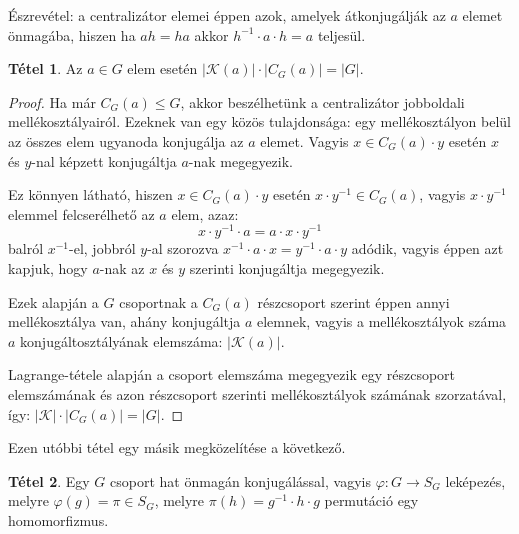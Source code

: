\documentclass[12pt]{book}
\theoremstyle{plain} %
\theoremstyle{definition} %
\newtheorem{theo/}{Tétel}[section]
\newenvironment{theo}
  {\renewcommand{\qedsymbol}{$\clubsuit$}%
   \pushQED{\qed}\begin{theo/}}
  {\popQED\end{theo/}}
\theoremstyle{remark}
\renewcommand\qedsymbol{$\blacksquare$}
\numberwithin{equation}{section}  %
\begin{document}
	Észrevétel: a centralizátor elemei éppen azok, amelyek átkonjugálják az $a$ elemet önmagába, hiszen ha $ah = ha$ akkor $h^{-1}\cdot a \cdot h = a$ teljesül.
	
	\begin{theo}\label{konjcentr}
		Az $a\in G$ elem esetén $|\mathcal{K}(a)| \cdot |C_G(a)| = |G|$.
	\end{theo}

	\begin{proof}
		Ha már $C_G(a)\leq G$, akkor beszélhetünk a centralizátor jobboldali mellékosztályairól. Ezeknek van egy közös tulajdonsága:  egy mellékosztályon belül az összes elem ugyanoda konjugálja az $a$ elemet. Vagyis $x\in C_G(a)\cdot y$ esetén $x$ és $y$-nal képzett konjugáltja $a$-nak megegyezik.
		
		Ez könnyen látható, hiszen $x\in C_G(a)\cdot y$ esetén $x\cdot y^{-1} \in C_G(a)$, vagyis $x\cdot y^{-1}$ elemmel felcserélhető az $a$ elem, azaz:
		\[ x\cdot y^{-1} \cdot a = a \cdot x \cdot y^{-1}  \]
		balról $x^{-1}$-el, jobbról $y$-al szorozva $x^{-1}\cdot a \cdot x = y^{-1} \cdot a \cdot y$ adódik, vagyis éppen azt kapjuk, hogy $a$-nak az $x$ és $y$ szerinti konjugáltja megegyezik.
		
		Ezek alapján a $G$ csoportnak a $C_G(a)$ részcsoport szerint éppen annyi mellékosztálya van, ahány konjugáltja $a$ elemnek, vagyis a mellékosztályok száma $a$ konjugáltosztályának elemszáma: $|\mathcal{K}(a)|$. 
		
		Lagrange-tétele alapján a csoport elemszáma megegyezik egy részcsoport elemszámának és azon részcsoport szerinti mellékosztályok számának szorzatával, így: $|\mathcal{K}|\cdot |C_G(a)| = |G|$.
	\end{proof}

	Ezen utóbbi tétel egy másik megközelítése a következő.
	
	\begin{theo}
		Egy $G$ csoport hat önmagán konjugálással, vagyis $\varphi\colon G\to S_G$ leképezés, melyre $\varphi(g) = \pi\in S_G$, melyre $\pi(h) = g^{-1}\cdot h \cdot g$ permutáció egy homomorfizmus.
	\end{theo}
\end{document}

